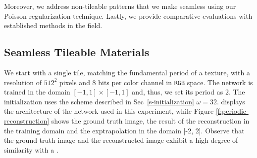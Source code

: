 Moreover, we address non-tileable patterns that we make seamless using our Poisson regularization technique. Lastly, we provide comparative evaluations with established methods in the field.

\subsection{Seamless Tileable Materials}\label{s-multires-2d}

We start with a single tile, matching the fundamental period of a texture, with a resolution of $512^2$ pixels and $8$ bits per color channel in \texttt{RGB} space. The network is trained in the domain $[-1, 1] \times [-1, 1]$ and, thus, we set its period as $2$. The initialization uses the scheme described in Sec~\ref{s-initialization}  $\omega=32$.  displays the architecture of the network used in this experiment, while Figure \ref{f:periodic-reconstruction} shows the ground truth image, the result of the reconstruction in the training domain and the exptrapolation in the domain [-2, 2]. Observe that the ground truth image and the reconstructed image exhibit a high degree of similarity with a .


